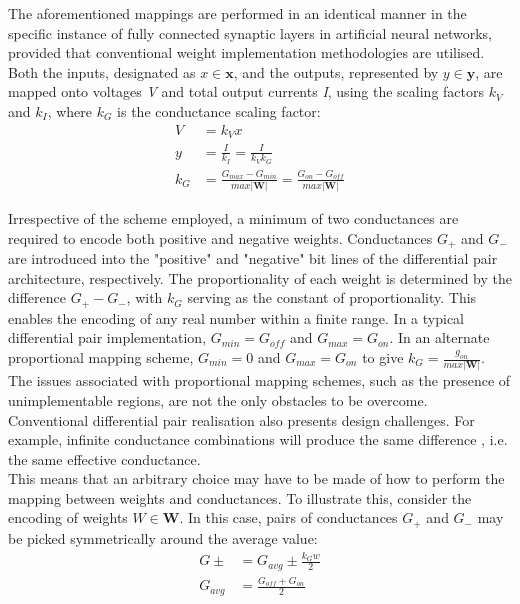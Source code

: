 \noindent The aforementioned mappings are performed in an identical manner in the specific instance of fully connected synaptic layers in artificial neural networks, provided that conventional weight implementation methodologies are utilised. Both the inputs, designated as $x \in \mathbf{x}$, and the outputs, represented by $y \in \mathbf{y}$, are mapped onto voltages \textit{V} and total output currents \textit{I}, using the scaling factors $k_V$ and $k_I$, where $k_G$ is the conductance scaling factor:
\begin{align}
V &= k_V x \label{eq:6.23} \\
y &= \frac{I}{k_I} = \frac{I}{k_V k_G} \label{eq:6.24} \\
k_G &= \frac{G_{max} - G_{min}}{max |\mathbf{W}|} = \frac{G_{on} - G_{off}}{max |\mathbf{W}|}\label{eq:6.25}
\end{align}


\noindent  Irrespective of the scheme employed, a minimum of two conductances are required to encode both positive and negative weights. Conductances $G_+$ and $G_-$ are introduced into the "positive" and "negative" bit lines of the differential pair architecture, respectively. The proportionality of each weight is determined by the difference $G_+ - G_-$, with $k_G$ serving as the constant of proportionality. This enables the encoding of any real number within a finite range. In a typical differential pair implementation, $G_{min} = G_{off}$ and $G_{max} = G_{on}$. In an alternate proportional mapping scheme, $G_{min} = 0$ and $G_{max} = G_{on}$ to give $k_G = \frac{g_{on}}{max |\mathbf{W}|}$.\\

\noindent The issues associated with proportional mapping schemes, such as the presence of unimplementable regions, are not the only obstacles to be overcome. Conventional differential pair realisation also presents design challenges. For example, infinite conductance combinations will produce the same difference \cite{kim20214k}, i.e. the same effective conductance. \\

\noindent This means that an arbitrary choice may have to be made of how to perform the mapping between weights and conductances. To illustrate this, consider the encoding of weights $W \in \mathbf{W}$. In this case, pairs of conductances $G_+$ and $G_-$ may be picked symmetrically around the average value:
\begin{align}
G\pm &= G_{avg} \pm \frac{k_G w}{2} \label{eq:6.26} \\
G_{avg} &= \frac{G_{off} + G_{on}}{2} \label{eq:6.27}
\end{align}


